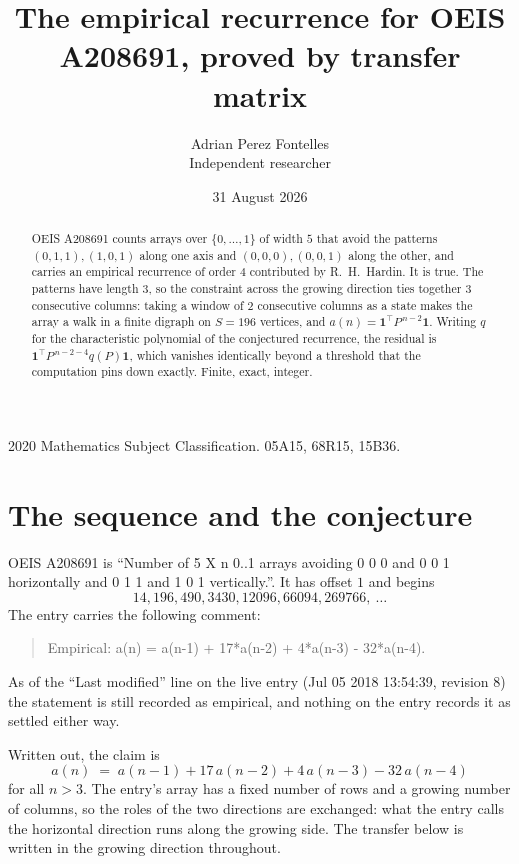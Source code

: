 \documentclass[11pt,a4paper]{article}
\title{The empirical recurrence for OEIS A208691, proved by transfer matrix}
\author{Adrian Perez Fontelles\\ \small Independent researcher}
\date{31 August 2026}
\theoremstyle{plain}
\theoremstyle{definition}
\begin{document}
\maketitle

\begin{abstract}
OEIS A208691 counts arrays over $\{0,\dots,1\}$ of width $5$ that avoid the patterns
$(0,1,1), (1,0,1)$ along one axis and $(0,0,0), (0,0,1)$ along the other, and carries an empirical recurrence of
order $4$ contributed by R.~H.~Hardin. It is true. The patterns have length $3$, so
the constraint across the growing direction ties together $3$ consecutive columns: taking a
window of $2$ consecutive columns as a state makes the array a walk in a finite digraph
on $S=196$ vertices, and $a(n)=\mathbf{1}^{\!\top}P^{\,n-2}\mathbf{1}$. Writing $q$
for the characteristic polynomial of the conjectured recurrence, the residual is
$\mathbf{1}^{\!\top}P^{\,n-2-4}q(P)\mathbf{1}$, which vanishes identically
beyond a threshold that the computation pins down exactly. Finite, exact, integer.
\end{abstract}

\noindent\small 2020 Mathematics Subject Classification. 05A15, 68R15, 15B36.\normalsize

\section{The sequence and the conjecture}

OEIS A208691 is ``Number of 5 X n 0..1 arrays avoiding 0 0 0 and 0 0 1 horizontally and 0 1 1 and 1 0 1 vertically.''. It has offset
$1$ and begins
\[
14, 196, 490, 3430, 12096, 66094, 269766,\ \dots
\]
The entry carries the following comment:
\begin{quote}\small
Empirical: a(n) = a(n-1) + 17*a(n-2) + 4*a(n-3) - 32*a(n-4).
\end{quote}
As of the ``Last modified'' line on the live entry (Jul 05 2018 13:54:39, revision
8) the statement is still recorded as empirical, and nothing on the entry
records it as settled either way.

Written out, the claim is
\begin{equation}\label{eq:conj}
a(n)\;=\;a(n-1) + 17\,a(n-2) + 4\,a(n-3) - 32\,a(n-4)
\end{equation}
for all $n>3$. The entry's array has a fixed number of rows and a growing number of
columns, so the roles of the two directions are exchanged: what the entry calls the
horizontal direction runs along the growing side. The transfer below is written in the
growing direction throughout.
\end{document}
